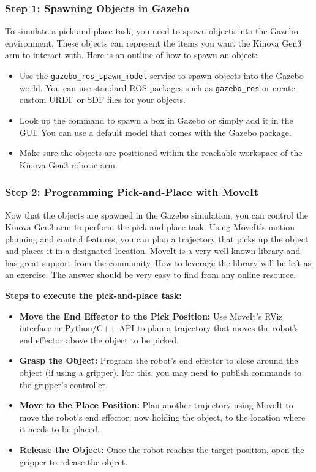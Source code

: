 \documentclass{article}
\begin{document}
\subsubsection{Step 1: Spawning Objects in Gazebo}
To simulate a pick-and-place task, you need to spawn objects into the Gazebo environment. These objects can represent the items you want the Kinova Gen3 arm to interact with. Here is an outline of how to spawn an object:
\begin{itemize}
    \item Use the \texttt{gazebo\_ros\_spawn\_model} service to spawn objects into the Gazebo world. You can use standard ROS packages such as \texttt{gazebo\_ros} or create custom URDF or SDF files for your objects.
    \item Look up the command to spawn a box in Gazebo or simply add it in the GUI. You can use a default model that comes with the Gazebo package.
    \item Make sure the objects are positioned within the reachable workspace of the Kinova Gen3 robotic arm.
\end{itemize}

\subsubsection{Step 2: Programming Pick-and-Place with MoveIt}
Now that the objects are spawned in the Gazebo simulation, you can control the Kinova Gen3 arm to perform the pick-and-place task. Using MoveIt’s motion planning and control features, you can plan a trajectory that picks up the object and places it in a designated location. MoveIt is a very well-known library and has great support from the community. How to leverage the library will be left as an exercise. The answer should be very easy to find from any online resource.

\textbf{Steps to execute the pick-and-place task:}
\begin{itemize}
    \item \textbf{Move the End Effector to the Pick Position:} Use MoveIt’s RViz interface or Python/C++ API to plan a trajectory that moves the robot’s end effector above the object to be picked.
    \item \textbf{Grasp the Object:} Program the robot’s end effector to close around the object (if using a gripper). For this, you may need to publish commands to the gripper’s controller.
    \item \textbf{Move to the Place Position:} Plan another trajectory using MoveIt to move the robot’s end effector, now holding the object, to the location where it needs to be placed.
    \item \textbf{Release the Object:} Once the robot reaches the target position, open the gripper to release the object.
\end{itemize}
\end{document}
